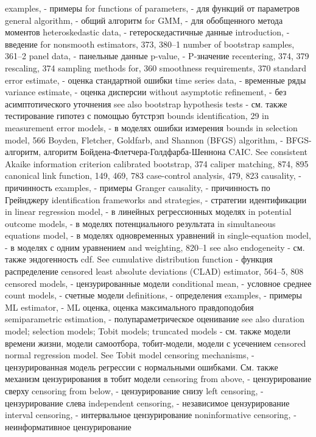 examples, - примеры
for functions of parameters, - для функций от параметров
general algorithm, - общий алгоритм
for GMM, - для обобщенного метода моментов
heteroskedastic data, - гетероскедастичные данные
introduction, - введение
for nonsmooth estimators, 373, 380–1 number of bootstrap samples, 361–2
panel data, - панельные данные
p-value, - P-значение
recentering, 374, 379
rescaling, 374
sampling methods for, 360
smoothness requirements, 370
standard error estimate, - оценка стандартной ошибки
time series data, - временные ряды
variance estimate, - оценка дисперсии
without asymptotic refinement, - без асимптотического уточнения
see also bootstrap hypothesis tests - см. также тестирование гипотез с помощью бутстрэп
bounds identification, 29
in measurement error models, - в моделях ошибки измерения
bounds in selection model, 566
Boyden, Fletcher, Goldfarb, and Shannon (BFGS) algorithm, - BFGS-алгоритм, алгоритм Бойдена-Флетчера-Голдфарба-Шеннона
CAIC. See consistent Akaike information criterion calibrated bootstrap, 374
caliper matching, 874, 895
canonical link function, 149, 469, 783 case-control analysis, 479, 823
causality, - причинность
examples, - примеры
Granger causality, - причинность по Грейнджеру
identification frameworks and strategies, - стратегии идентификации
in linear regression model, - в линейных регрессионных моделях
in potential outcome models, - в моделях потенциального результата
in simultaneous equations model, - в моделях одновременных уравнений
in single-equation model, - в моделях с одним уравнением
and weighting, 820–1
see also endogeneity - см. также эндогенность
cdf. See cumulative distribution function - функция распределение
censored least absolute deviations (CLAD) estimator,
564–5, 808
censored models, - цензурированные модели
conditional mean, - условное среднее
count models, - счетные модели
definitions, - определения
examples, - примеры
ML estimator, - ML оценка, оценка максимального правдоподобия
semiparametric estimation, - полупараметрическое оценивание
see also duration model; selection models; Tobit models; truncated models - см. также модели времени жизни, модели самоотбора, тобит-модели, модели с усечением
censored normal regression model. See Tobit model censoring mechanisms, - цензурированная модель регрессии с нормальными ошибками. См. также механизм цензурирования в тобит модели
censoring from above, - цензурирование сверху
censoring from below, - цензурирование снизу
left censoring, - цензурирование слева
independent censoring, - независимое цензурирование
interval censoring, - интервальное цензурирование
noninformative censoring, - неинформативное цензурирование
